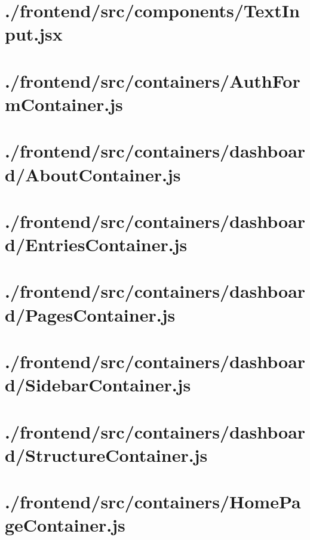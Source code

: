\documentclass[11pt]{informatics-report}
\begin{document}
\newpage
\section{./frontend/src/components/TextInput.jsx}


\newpage
\section{./frontend/src/containers/AuthFormContainer.js}


\newpage
\section{./frontend/src/containers/dashboard/AboutContainer.js}


\newpage
\section{./frontend/src/containers/dashboard/EntriesContainer.js}


\newpage
\section{./frontend/src/containers/dashboard/PagesContainer.js}


\newpage
\section{./frontend/src/containers/dashboard/SidebarContainer.js}


\newpage
\section{./frontend/src/containers/dashboard/StructureContainer.js}


\newpage
\section{./frontend/src/containers/HomePageContainer.js}

\end{document}
